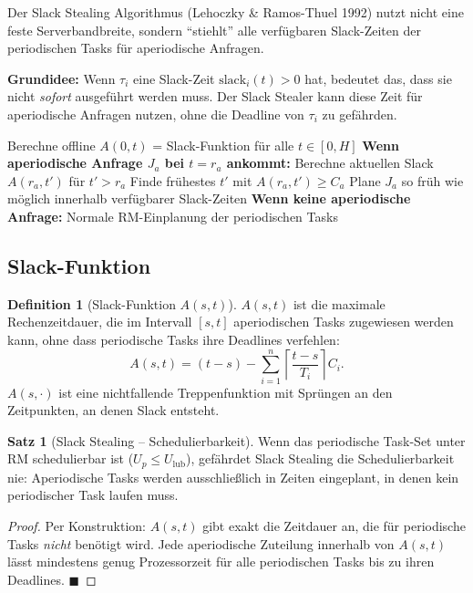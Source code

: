 ﻿\documentclass[a4paper,12pt]{report}
\theoremstyle{definition}
\newtheorem{definition}{Definition}[chapter]
\newtheorem{satz}{Satz}[chapter]
\begin{document}
Der Slack Stealing Algorithmus (Lehoczky \& Ramos-Thuel 1992) nutzt nicht
eine feste Serverbandbreite, sondern ``stiehlt'' alle verfügbaren Slack-Zeiten
der periodischen Tasks für aperiodische Anfragen.

\textbf{Grundidee:} Wenn $\tau_i$ eine Slack-Zeit $\text{slack}_i(t) > 0$ hat,
bedeutet das, dass sie nicht \emph{sofort} ausgeführt werden muss. Der
Slack Stealer kann diese Zeit für aperiodische Anfragen nutzen, ohne die
Deadline von $\tau_i$ zu gefährden.

\begin{algorithm}[H]
	\caption{Slack Stealing (vereinfachte Darstellung)}
	\begin{algorithmic}[1]
		\State Berechne offline $A(0, t)$ = Slack-Funktion für alle $t \in [0, H]$
		\State
		\State \textbf{Wenn aperiodische Anfrage $J_a$ bei $t=r_a$ ankommt:}
		\State Berechne aktuellen Slack $A(r_a, t')$ für $t' > r_a$
		\State Finde frühestes $t'$ mit $A(r_a, t') \geq C_a$
		\State Plane $J_a$ so früh wie möglich innerhalb verfügbarer Slack-Zeiten
		\State
		\State \textbf{Wenn keine aperiodische Anfrage:}
		\State Normale RM-Einplanung der periodischen Tasks
	\end{algorithmic}
\end{algorithm}

\subsection{Slack-Funktion}

\begin{definition}[Slack-Funktion $A(s,t)$]
	$A(s, t)$ ist die maximale Rechenzeitdauer, die im Intervall $[s, t]$
	aperiodischen Tasks zugewiesen werden kann, ohne dass periodische Tasks
	ihre Deadlines verfehlen:
	\[
		A(s, t) = (t-s) - \sum_{i=1}^n \left\lceil \frac{t-s}{T_i} \right\rceil C_i.
	\]
	$A(s, \cdot)$ ist eine nichtfallende Treppenfunktion mit Sprüngen an den
	Zeitpunkten, an denen Slack entsteht.
\end{definition}

\begin{satz}[Slack Stealing -- Schedulierbarkeit]
	Wenn das periodische Task-Set unter RM schedulierbar ist ($U_p \leq U_{\text{lub}}$),
	gefährdet Slack Stealing die Schedulierbarkeit nie: Aperiodische Tasks werden
	ausschließlich in Zeiten eingeplant, in denen kein periodischer Task laufen muss.
\end{satz}

\begin{proof}
	Per Konstruktion: $A(s, t)$ gibt exakt die Zeitdauer an, die für periodische
	Tasks \emph{nicht} benötigt wird. Jede aperiodische Zuteilung innerhalb von
	$A(s, t)$ lässt mindestens genug Prozessorzeit für alle periodischen Tasks
	bis zu ihren Deadlines. \hfill$\blacksquare$
\end{proof}
\end{document}
